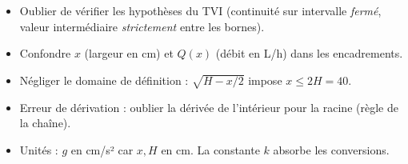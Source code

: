 \documentclass[11pt]{article}
\begin{document}
\begin{attention}
\begin{itemize}
    \item Oublier de vérifier les hypothèses du TVI (continuité sur intervalle \emph{fermé}, valeur intermédiaire \emph{strictement} entre les bornes).
    \item Confondre $x$ (largeur en cm) et $Q(x)$ (débit en L/h) dans les encadrements.
    \item Négliger le domaine de définition : $\sqrt{H - x/2}$ impose $x \le 2H = 40$.
    \item Erreur de dérivation : oublier la dérivée de l'intérieur pour la racine (règle de la chaîne).
    \item Unités : $g$ en cm/s² car $x, H$ en cm. La constante $k$ absorbe les conversions.
\end{itemize}
\end{attention}
\end{document}
